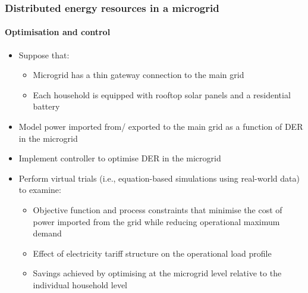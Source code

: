 \documentclass[presentation, smaller, xcolor=table]{beamer}
\begin{document}
\begin{frame}
	\frametitle{Distributed energy resources in a microgrid}
	\framesubtitle{Optimisation and control}

	\begin{itemize}
		\item  Suppose that:
		\begin{itemize}
			\item  Microgrid has a thin gateway connection to the main grid
			\item  Each household is equipped with rooftop solar panels and a residential battery
		\end{itemize}
		
		\item  Model power imported from/ exported to the main grid as a function of DER in the microgrid
		
		\item  Implement controller to optimise DER in the microgrid
		
		\item  Perform virtual trials (i.e., equation-based simulations using real-world data) to examine:
		\begin{itemize}
			\item  Objective function and process constraints that minimise the cost of power imported from the grid while reducing operational maximum demand
			\item  Effect of electricity tariff structure on the operational load profile
			\item  Savings achieved by optimising at the microgrid level relative to the individual household level
		\end{itemize}
	
	\end{itemize}

\end{frame}
\end{document}
